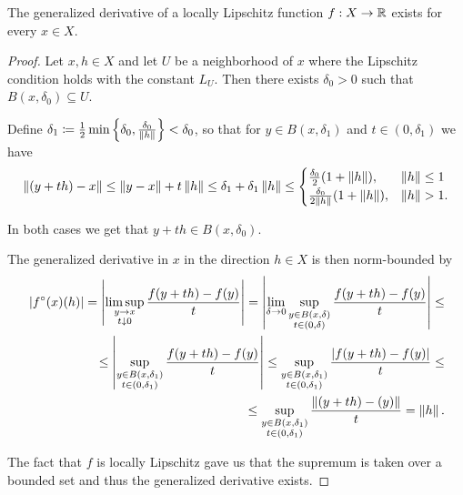 \begin{proposition}\label{thm:clarke_derivative_exists}
  The generalized derivative of a locally Lipschitz function $f: X \to \mathbb R$ exists for every $x \in X$.
\end{proposition}
\begin{proof}
  Let $x, h \in X$ and let $U$ be a neighborhood of $x$ where the Lipschitz condition holds with the constant $L_U$. Then there exists $\delta_0 > 0$ such that $B(x, \delta_0) \subseteq U$.

  Define $\delta_1 \coloneqq \frac 1 2 \min \left\{\delta_0, \frac {\delta_0} {\left\Vert h \right\Vert} \right\} < \delta_0$, so that for $y \in B(x, \delta_1)$ and $t \in (0, \delta_1)$ we have
  \begin{align*}
    \left\Vert (y + th) - x \right\Vert
    \leq
    \left\Vert y - x \right\Vert + t \left\Vert h \right\Vert
    \leq
    \delta_1 + \delta_1 \left\Vert h \right\Vert
    \leq
    \begin{cases}
      \frac {\delta_0} 2 (1 + \left\Vert h \right\Vert), &\left\Vert h \right\Vert \leq 1 \\
      \frac {\delta_0} {2 \left\Vert h \right\Vert} (1 + \left\Vert h \right\Vert), &\left\Vert h \right\Vert > 1.
    \end{cases}
  \end{align*}

  In both cases we get that $y + th \in B(x, \delta_0)$.

  The generalized derivative in $x$ in the direction $h \in X$ is then norm-bounded by
  \begin{align*}
    \left\vert f^\circ(x)(h) \right\vert
    =
    \left\vert \limsup_{\substack{y \to x \\ t \downarrow 0}} \frac {f(y + th) - f(y)} t \right\vert
    =
    \left\vert \lim_{\delta \to 0} \sup_{\substack{y \in B(x, \delta) \\ t \in (0, \delta)}} \frac {f(y + th) - f(y)} t \right\vert
    \leq \\ \leq
    \left\vert \sup_{\substack{y \in B(x, \delta_1) \\ t \in (0, \delta_1)}} \frac {f(y + th) - f(y)} t \right\vert
    \leq
    \sup_{\substack{y \in B(x, \delta_1) \\ t \in (0, \delta_1)}} \frac {\left\vert f(y + th) - f(y) \right\vert} t
    \leq \\ \leq
    \sup_{\substack{y \in B(x, \delta_1) \\ t \in (0, \delta_1)}} \frac {\left\Vert (y + th) - (y) \right\Vert} t
    =
    \left\Vert h \right\Vert.
  \end{align*}

  The fact that $f$ is locally Lipschitz gave us that the supremum is taken over a bounded set and thus the generalized derivative exists.
\end{proof}
